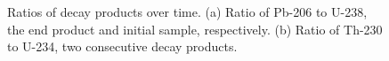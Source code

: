 \documentclass{article}
\begin{document}
\begin{itemize}
\begin{figure}[h!]
\begin{subfigure}{.5\textwidth}
      \caption{}
    \end{subfigure}
    \caption{Ratios of decay products over time. (a) Ratio of Pb-206 to U-238, the end product and initial sample, respectively. (b) Ratio of Th-230 to U-234, two consecutive decay products.}
    \label{fig:prob1}
    \end{figure}
    
\end{itemize}
\end{document}
